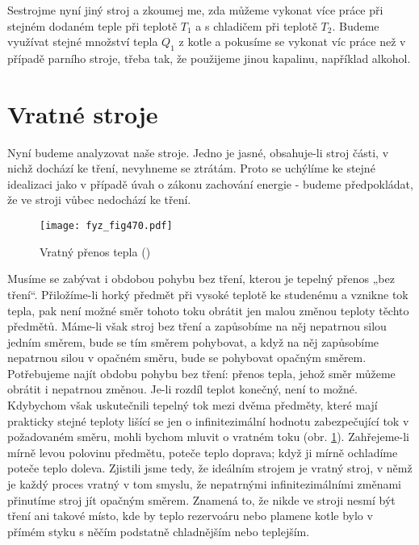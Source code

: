     Sestrojme nyní jiný stroj a zkoumej me, zda můžeme vykonat více práce při stejném dodaném teple
    při teplotě \(T_1\) a s chladičem při teplotě \(T_2\). Budeme využívat stejné množství tepla
    \(Q_1\) z kotle a pokusíme se vykonat víc práce než v případě parního stroje, třeba tak, že
    použijeme jinou kapalinu, například alkohol.

  \section{Vratné stroje}\label{fyz:IchapXLIVsecIII}
    Nyní budeme analyzovat naše stroje. Jedno je jasné, obsahuje-li stroj části, v nichž dochází ke
    tření, nevyhneme se ztrátám. Proto se uchýlíme ke stejné idealizaci jako v případě úvah o zákonu
    zachování energie - budeme předpokládat, že ve stroji vůbec nedochází ke tření.
  
    \begin{figure}[ht!] %
      \centering
      \texttt{[image: fyz\_fig470.pdf]}
      \caption{Vratný přenos tepla (\cite[s.~707]{Feynman01})}
      \label{fyz:fig470}
    \end{figure}

    Musíme se zabývat i obdobou pohybu bez tření, kterou je tepelný přenos „bez tření“. Přiložíme-li
    horký předmět při vysoké teplotě ke studenému a vznikne tok tepla, pak není možné směr tohoto
    toku obrátit jen malou změnou teploty těchto předmětů. Máme-li však stroj bez tření a zapůsobíme
    na něj nepatrnou silou jedním směrem, bude se tím směrem pohybovat, a když na něj zapůsobíme
    nepatrnou silou v opačném směru, bude se pohybovat opačným směrem. Potřebujeme najít obdobu
    pohybu bez tření: přenos tepla, jehož směr můžeme obrátit i nepatrnou změnou. Je-li rozdíl
    teplot konečný, není to možné. Kdybychom však uskutečnili tepelný tok mezi dvěma předměty, které
    mají prakticky stejné teploty lišící se jen o inﬁnitezimální hodnotu zabezpečující tok v
    požadovaném směru, mohli bychom mluvit o vratném toku (obr. \ref{fyz:fig470}). Zahřejeme-li
    mírně levou polovinu předmětu, poteče teplo doprava; když ji mírně ochladíme poteče teplo
    doleva. Zjistili jsme tedy, že ideálním strojem je vratný stroj, v němž je každý proces vratný v
    tom smyslu, že nepatrnými inﬁnitezimálními změnami přinutíme stroj jít opačným směrem. Znamená
    to, že nikde ve stroji nesmí být tření ani takové místo, kde by teplo rezervoáru nebo plamene
    kotle bylo v přímém styku s něčím podstatně chladnějším nebo teplejším.


